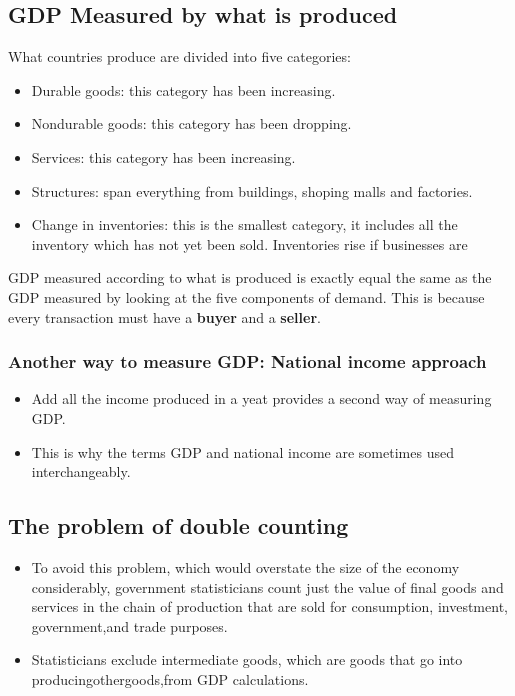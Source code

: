 \documentclass{article}
\begin{document}

\subsection{GDP Measured by what is produced}
What countries produce are divided into five categories: 
\begin{itemize}
    \item Durable goods: this category has been increasing.
    \item Nondurable goods: this category has been dropping.
    \item Services: this category has been increasing. 
    \item Structures: span everything from buildings, shoping malls and factories.
    \item Change in inventories: this is the smallest category, it includes all the inventory which has not yet been sold. Inventories rise if businesses are 
\end{itemize}
GDP measured according to what is produced is exactly equal the same as the GDP measured by looking at the five components of demand. This is because every transaction must have a \textbf{buyer} and a \textbf{seller}.

\subsubsection{Another way to measure GDP: National income approach}
\begin{itemize}
    \item Add all the income produced in a yeat provides a second way of measuring GDP.
    \item This is why the terms GDP and national income are sometimes used interchangeably. 
\end{itemize}


\subsection{The problem of double counting}
\begin{itemize}
    \item To avoid this problem, which would overstate the size of the economy considerably, government statisticians count just the value of final goods and services in the chain of production that are sold for consumption, investment, government,and trade purposes.
    \item Statisticians exclude intermediate goods, which are goods that go into producingothergoods,from GDP calculations. 
\end{itemize}
\end{document}
